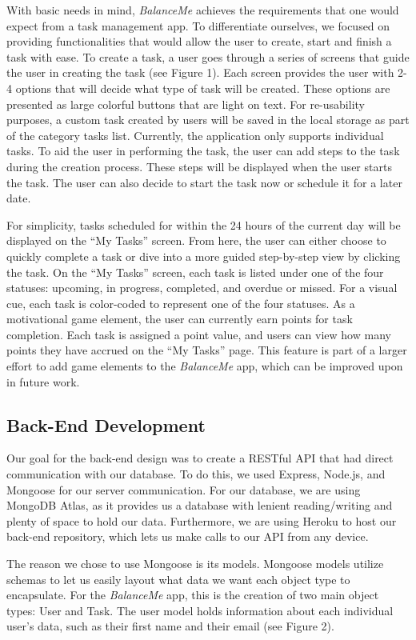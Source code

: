 \documentclass{sigchi}
\begin{document}
With basic needs in mind, \textit{BalanceMe} achieves the requirements that one
would expect from a task management app. To differentiate ourselves, we focused
on providing functionalities that would allow the user to create, start and
finish a task with ease. To create a task, a user goes through a series of
screens that guide the user in creating the task (see Figure 1). Each screen
provides the user with 2-4 options that will decide what type of task will be
created. These options are presented as large colorful buttons that are light
on text. For re-usability purposes, a custom task created by users will be
saved in the local storage as part of the category tasks list. Currently, the
application only supports individual tasks. To aid the user in performing the
task, the user can add steps to the task during the creation process. These
steps will be displayed when the user starts the task. The user can also decide
to start the task now or schedule it for a later date.

For simplicity, tasks scheduled for within the 24 hours of the current day will
be displayed on the ``My Tasks'' screen.  From here, the user can either choose
to quickly complete a task or dive into a more guided step-by-step view by
clicking the task. On the ``My Tasks'' screen, each task is listed under one of
the four statuses: upcoming, in progress, completed, and overdue or missed. For
a visual cue, each task is color-coded to represent one of the four statuses.
As a motivational game element, the user can currently earn points for task
completion. Each task is assigned a point value, and users can view how many
points they have accrued on the ``My Tasks'' page. This feature is part of a
larger effort to add game elements to the \textit{BalanceMe} app, which can be
improved upon in future work.

\subsection{Back-End Development}
Our goal for the back-end design was to create a RESTful API that had direct
communication with our database. To do this, we used Express, Node.js, and
Mongoose for our server communication. For our database, we are using MongoDB
Atlas, as it provides us a database with lenient reading/writing and plenty of
space to hold our data. Furthermore, we are using Heroku to host our back-end
repository, which lets us make calls to our API from any device.

The reason we chose to use Mongoose is its models. Mongoose models utilize
schemas to let us easily layout what data we want each object type to
encapsulate. For the \textit{BalanceMe} app, this is the creation of two main
object types: User and Task. The user model holds information about each
individual user’s data, such as their first name and their email (see Figure 2).
\end{document}
